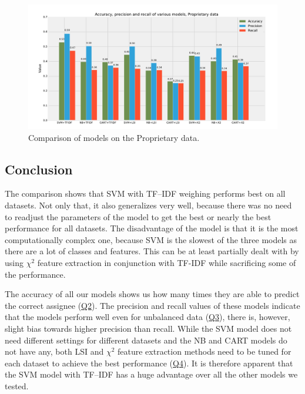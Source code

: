 \begin{figure}[htbp]
    \centering
        \includegraphics[width=\textwidth]{./images/comparison_of_models/proprietary.pdf}
    \caption{Comparison of models on the Proprietary data.}
    \label{fig:results.models.proprietary}
\end{figure}

\subsection{Conclusion}

The comparison shows that SVM with TF--IDF weighing performs best on all datasets. Not only that, it also generalizes very well, because there was no need to readjust the parameters of the model to get the best or nearly the best performance for all datasets. The disadvantage of the model is that it is the most computationally complex one, because SVM is the slowest of the three models as there are a lot of classes and features. This can be at least partially dealt with by using $\chi^2$ feature extraction in conjunction with TF-IDF while sacrificing some of the performance.

The accuracy of all our models shows us how many times they are able to predict the correct assignee (\hyperlink{question:2}{Q2}). The precision and recall values of these models indicate that the models perform well even for unbalanced data (\hyperlink{question:3}{Q3}), there is, however, slight bias towards higher precision than recall. While the SVM model does not need different settings for different datasets and the NB and CART models do not have any, both LSI and $\chi^2$ feature extraction methods need to be tuned for each dataset to achieve the best performance (\hyperlink{question:4}{Q4}). It is therefore apparent that the SVM model with TF--IDF has a huge advantage over all the other models we tested.

